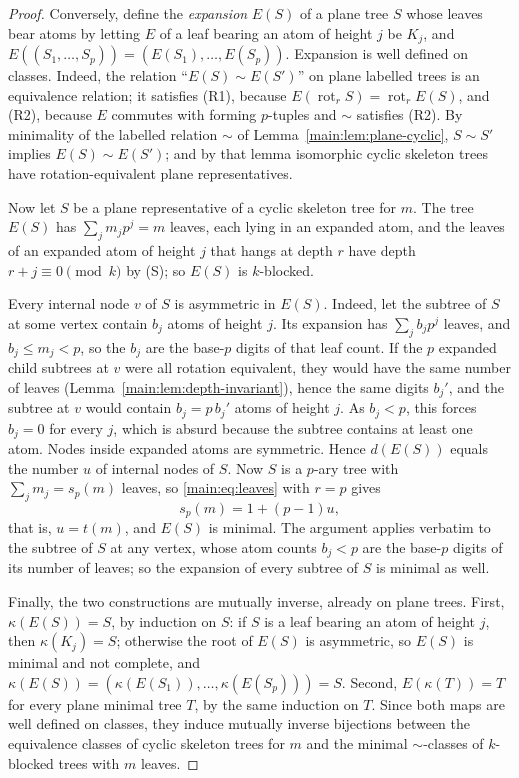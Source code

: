 \documentclass[11pt]{article}
\theoremstyle{definition}
\theoremstyle{remark}
\numberwithin{equation}{section}
\numberwithin{figure}{section}
\newcommand{\rot}{\operatorname{rot}}
\begin{document}
\begin{proof}
Conversely, define the \emph{expansion} $E(S)$ of a plane tree $S$ whose leaves bear atoms by letting $E$ of a leaf bearing an atom of height $j$ be $K_j$, and $E((S_1,\ldots,S_p))=(E(S_1),\ldots,E(S_p))$.  Expansion is well defined on classes.  Indeed, the relation ``$E(S)\sim E(S')$'' on plane labelled trees is an equivalence relation; it satisfies (R1), because $E(\rot_rS)=\rot_rE(S)$, and (R2), because $E$ commutes with forming $p$-tuples and $\sim$ satisfies (R2).  By minimality of the labelled relation $\sim$ of Lemma~\ref{main:lem:plane-cyclic}, $S\sim S'$ implies $E(S)\sim E(S')$; and by that lemma isomorphic cyclic skeleton trees have rotation-equivalent plane representatives.

Now let $S$ be a plane representative of a cyclic skeleton tree for $m$.  The tree $E(S)$ has $\sum_jm_jp^j=m$ leaves, each lying in an expanded atom, and the leaves of an expanded atom of height $j$ that hangs at depth $r$ have depth $r+j\equiv0\pmod k$ by (S); so $E(S)$ is $k$-blocked.

Every internal node $v$ of $S$ is asymmetric in $E(S)$.  Indeed, let the subtree of $S$ at some vertex contain $b_j$ atoms of height $j$.  Its expansion has $\sum_jb_jp^j$ leaves, and $b_j\le m_j<p$, so the $b_j$ are the base-$p$ digits of that leaf count.  If the $p$ expanded child subtrees at $v$ were all rotation equivalent, they would have the same number of leaves (Lemma~\ref{main:lem:depth-invariant}), hence the same digits $b_j'$, and the subtree at $v$ would contain $b_j=p\,b_j'$ atoms of height $j$.  As $b_j<p$, this forces $b_j=0$ for every $j$, which is absurd because the subtree contains at least one atom.  Nodes inside expanded atoms are symmetric.  Hence $d(E(S))$ equals the number $u$ of internal nodes of $S$.  Now $S$ is a $p$-ary tree with $\sum_jm_j=s_p(m)$ leaves, so \eqref{main:eq:leaves} with $r=p$ gives
\[
 s_p(m)=1+(p-1)u,
\]
that is, $u=t(m)$, and $E(S)$ is minimal.  The argument applies verbatim to the subtree of $S$ at any vertex, whose atom counts $b_j<p$ are the base-$p$ digits of its number of leaves; so the expansion of every subtree of $S$ is minimal as well.

Finally, the two constructions are mutually inverse, already on plane trees.  First, $\kappa(E(S))=S$, by induction on $S$: if $S$ is a leaf bearing an atom of height $j$, then $\kappa(K_j)=S$; otherwise the root of $E(S)$ is asymmetric, so $E(S)$ is minimal and not complete, and $\kappa(E(S))=(\kappa(E(S_1)),\ldots,\kappa(E(S_p)))=S$.  Second, $E(\kappa(T))=T$ for every plane minimal tree $T$, by the same induction on $T$.  Since both maps are well defined on classes, they induce mutually inverse bijections between the equivalence classes of cyclic skeleton trees for $m$ and the minimal $\sim$-classes of $k$-blocked trees with $m$ leaves.
\end{proof}
\end{document}
